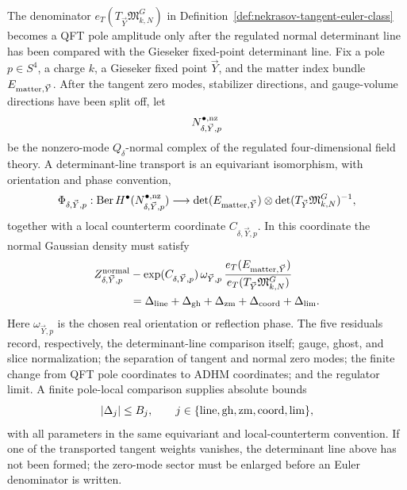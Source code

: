 \begin{controlledapproximation}
\label{ca:pole-local-determinant-line-transport}
The denominator
\(e_T(T_{\vec Y}\mathfrak M_{k,N}^{G})\) in
Definition~\ref{def:nekrasov-tangent-euler-class} becomes a QFT pole
amplitude only after the regulated normal determinant line has been compared
with the Gieseker fixed-point determinant line.  Fix a pole \(p\in S^4\), a
charge \(k\), a Gieseker fixed point \(\vec Y\), and the matter index bundle
\(E_{{\rm matter},\vec Y}\).  After the tangent zero modes, stabilizer
directions, and gauge-volume directions have been split off, let
\[
  N^{\bullet,{\rm nz}}_{\delta,\vec Y,p}
\]
be the nonzero-mode \(Q_\delta\)-normal complex of the regulated
four-dimensional field theory.  A determinant-line transport is an
equivariant isomorphism, with orientation and phase convention,
\begin{equation}
  \Phi_{\delta,\vec Y,p}:
  \operatorname{Ber}H^\bullet
  (N^{\bullet,{\rm nz}}_{\delta,\vec Y,p})
  \longrightarrow
  \det(E_{{\rm matter},\vec Y})
  \otimes
  \det(T_{\vec Y}\mathfrak M_{k,N}^{G})^{-1},
  \label{eq:pole-local-determinant-line-transport}
\end{equation}
together with a local counterterm coordinate \(C_{\delta,\vec Y,p}\).  In this
coordinate the normal Gaussian density must satisfy
\begin{equation}
\begin{aligned}
  Z^{\rm normal}_{\delta,\vec Y,p}
  &-
  \exp(C_{\delta,\vec Y,p})\,\omega_{\vec Y,p}\,
  \frac{e_T(E_{{\rm matter},\vec Y})}
       {e_T(T_{\vec Y}\mathfrak M_{k,N}^{G})}
\\
  &=
  \Delta_{\rm line}
  +\Delta_{\rm gh}
  +\Delta_{\rm zm}
  +\Delta_{\rm coord}
  +\Delta_{\rm lim}.
  \label{eq:pole-local-determinant-line-residuals}
\end{aligned}
\end{equation}
Here \(\omega_{\vec Y,p}\) is the chosen real orientation or reflection phase.
The five residuals record, respectively, the determinant-line comparison
itself; gauge, ghost, and slice normalization; the separation of tangent and
normal zero modes; the finite change from QFT pole coordinates to ADHM
coordinates; and the regulator limit.  A finite pole-local comparison supplies
absolute bounds
\[
  |\Delta_j|\le B_j,\qquad
  j\in\{{\rm line},{\rm gh},{\rm zm},{\rm coord},{\rm lim}\},
\]
with all parameters in the same equivariant and local-counterterm convention.
If one of the transported tangent weights vanishes, the determinant line above
has not been formed; the zero-mode sector must be enlarged before an Euler
denominator is written.


\end{controlledapproximation}

